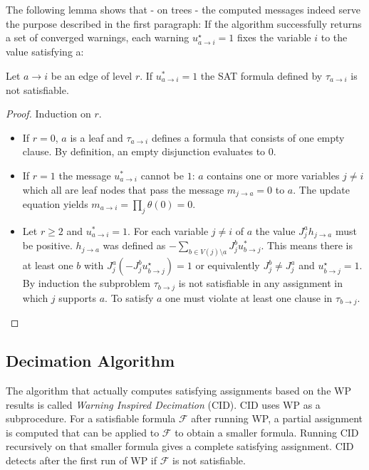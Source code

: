 The following lemma shows that - on trees - the computed messages indeed serve the purpose described in the first paragraph: If the algorithm successfully returns a set of converged warnings, each warning $u^{\star}_{a \rightarrow i} = 1$ fixes the variable $i$ to the value satisfying a:

\begin{lemma}\cite{survprob} Let $a \rightarrow i$ be an edge of level $r$. \newline
If $u^{\ast}_{a \rightarrow i} = 1$ the SAT formula defined by $\tau_{a \rightarrow i}$ is not satisfiable.

\begin{proof} Induction on $r$.
\begin{itemize}
	\item If $r = 0$, $a$ is a leaf and $\tau_{a \rightarrow i}$ defines a formula that consists of one empty clause. By definition, an empty disjunction evaluates to $0$.
	\item If $r = 1$ the message $u^{\ast}_{a \rightarrow i}$ cannot be $1$: $a$ contains one or more variables $j \neq i$ which all are leaf nodes that pass the message $m_{j \rightarrow a} = 0$ to $a$. The update equation yields $m_{a \rightarrow i} = \prod_j \theta(0) = 0$.
	\item Let $r \geq 2$ and $u^{\ast}_{a \rightarrow i} = 1$. For each variable $j \neq i$ of $a$ the value $J_j^a h_{j \rightarrow a}$ must be positive. $h_{j \rightarrow a}$ was defined as $-\sum_{b \in V(j) \setminus a} J_j^b u^\ast_{b \rightarrow j}$. This means there is at least one $b$ with $J_j^a (-J_j^b u^\star_{b \rightarrow j})= 1$ or equivalently $J_j^b \neq J_j^a$ and  $u^\star_{b \rightarrow j} = 1$. \newline By induction the subproblem $\tau_{b \rightarrow j}$ is not satisfiable in any assignment in which $j$ supports $a$. To satisfy $a$ one must violate at least one clause in $\tau_{b \rightarrow j}$.
\end{itemize}
\end{proof}
\end{lemma}



\subsection{Decimation Algorithm}

The algorithm that actually computes satisfying assignments based on the WP results is called \emph{Warning Inspired Decimation} (CID). CID uses WP as a subprocedure. For a satisfiable formula $\mathcal{F}$ after running WP, a partial assignment is computed that can be applied to $\mathcal{F}$ to obtain a smaller formula. Running CID recursively on that smaller formula gives a complete satisfying assignment. CID detects after the first run of WP if $\mathcal{F}$ is not satisfiable. \newline

